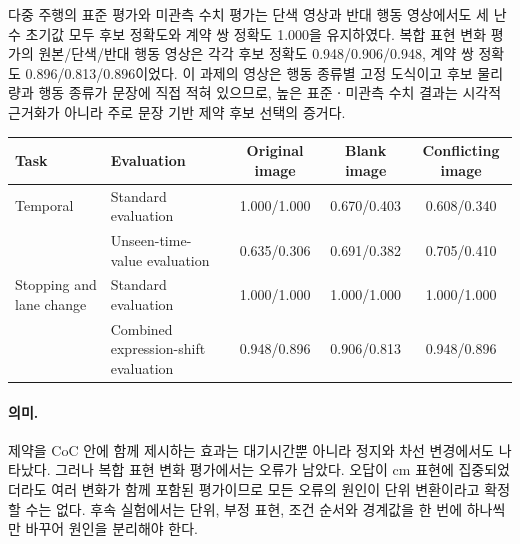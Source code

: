 다중 주행의 표준 평가와 미관측 수치 평가는 단색 영상과 반대 행동 영상에서도 세 난수 초기값 모두 후보 정확도와 계약 쌍 정확도 1.000을 유지하였다. 복합 표현 변화 평가의 원본/단색/반대 행동 영상은 각각 후보 정확도 0.948/0.906/0.948, 계약 쌍 정확도 0.896/0.813/0.896이었다. 이 과제의 영상은 행동 종류별 고정 도식이고 후보 물리량과 행동 종류가 문장에 직접 적혀 있으므로, 높은 표준ㆍ미관측 수치 결과는 시각적 근거화가 아니라 주로 문장 기반 제약 후보 선택의 증거다.

\begin{table}[!t]
\centering
{}
\label{tab:image-ablation}
\footnotesize
\begin{tabular}{llccc}
\toprule
Task & Evaluation & Original image & Blank image & Conflicting image \\
\midrule
Temporal & Standard evaluation & 1.000/1.000 & 0.670/0.403 & 0.608/0.340 \\
 & Unseen-time-value evaluation & 0.635/0.306 & 0.691/0.382 & 0.705/0.410 \\
Stopping and lane change & Standard evaluation & 1.000/1.000 & 1.000/1.000 & 1.000/1.000 \\
 & Combined expression-shift evaluation & 0.948/0.896 & 0.906/0.813 & 0.948/0.896 \\
\bottomrule
\end{tabular}
\end{table}

\paragraph{의미.}
제약을 CoC 안에 함께 제시하는 효과는 대기시간뿐 아니라 정지와 차선 변경에서도 나타났다. 그러나 복합 표현 변화 평가에서는 오류가 남았다. 오답이 cm 표현에 집중되었더라도 여러 변화가 함께 포함된 평가이므로 모든 오류의 원인이 단위 변환이라고 확정할 수는 없다. 후속 실험에서는 단위, 부정 표현, 조건 순서와 경계값을 한 번에 하나씩만 바꾸어 원인을 분리해야 한다.

